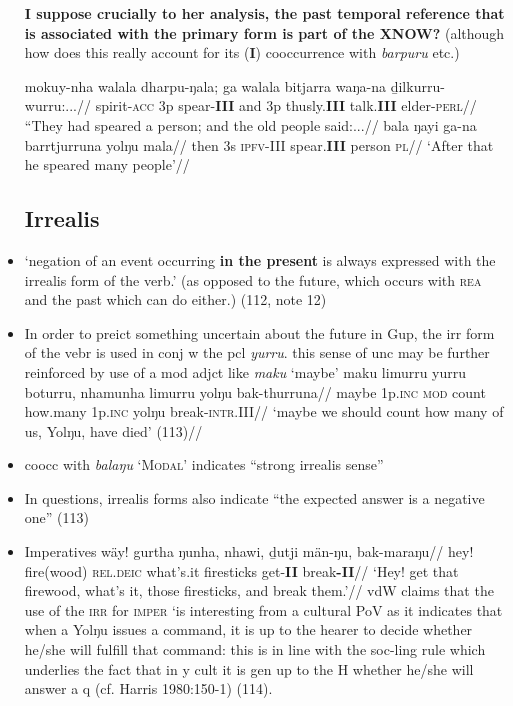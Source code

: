 \documentclass[10pt]{article}
\begin{document}
\begin{itemize}
	\textbf{I suppose crucially to her analysis, the past temporal reference that is associated with the primary form is part of the XNOW?} (although how does this really account for its (\textbf{I}) cooccurrence with \textit{barpuru} etc.)
	
	\pex\a\begingl\gla mokuy-nha walala dharpu-ŋala; ga walala bitjarra waŋa-na ḏilkurru-wurru:...//
	\glb spirit-\textsc{acc} 3p spear-\textbf{III} and 3p thusly.\textbf{III} talk.\textbf{III} elder\textsc{-perl}//
	\glft``They had speared a person; and the old people said:...//\endgl
	\a\begingl\gla bala ŋayi ga-na barrtjurruna yolŋu mala//
	\glb then 3s \textsc{ipfv-III} spear.\textbf{III} person \textsc{pl}//
	\glft`After that he speared many people'//\endgl\xe

	\subsection{Irrealis}
	\item `negation of an event occurring \textbf{in the present} is always expressed with the irrealis form of the verb.' (as opposed to the future, which occurs with \textsc{rea} and the past which can do either.) (112, note 12)
	\item In order to preict something uncertain about the future in Gup, the irr form of the vebr is used in conj w the pcl \textit{yurru}. this sense of unc may be further reinforced by use of a mod adjct like \textit{maku} `maybe'
	\pex\begingl\gla maku limurru yurru boturru, nhamunha limurru yolŋu bak-thurruna//
	\glb maybe 1p\textsc{.inc} \textsc{mod} count how.many 1p\textsc{.inc} yolŋu break\textsc{-intr.III}//
	\glft `maybe we should count how many of us, Yolŋu, have died' (113)//\endgl\xe
	\item coocc with \textit{balaŋu} `\textsc{Modal}' indicates ``strong irrealis sense''
	\item In questions, irrealis forms also indicate ``the expected answer is a negative one'' (113)
	\item Imperatives 
	\pex\begingl\gla wäy! gurtha ŋunha, nhawi, ḏutji män-ŋu, bak-maraŋu//
	\glb hey! fire(wood) \textsc{rel.deic} what's.it firesticks get-\textbf{II} break\textbf{-II}//
	\glft`Hey! get that firewood, what's it, those firesticks, and break them.'//\endgl\xe
 	vdW claims that the use of the \textsc{irr} for \textsc{imper} `is interesting from a cultural PoV as it indicates that when a Yolŋu issues a command, it is up to the hearer to decide whether he/she will fulfill that command: this is in line with the soc-ling rule which underlies the fact that in y cult it is gen up to the H whether he/she will answer a q (cf. Harris 1980:150-1) (114).

\end{itemize}
\end{document}
